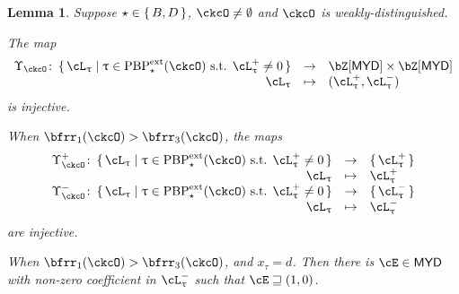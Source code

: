 \documentclass[12pt,a4paper]{amsart}
\newcommand{\pr}{\mathrm{pr}}
\def\MYD{{\mathsf{MYD}}}
\def\pac#1{\ac_{#1}^+}
\def\nac#1{\ac_{#1}^-}
\def\ac{\cL}
\numberwithin{equation}{section}
\newtheorem{lem}[thm]{Lemma}
\theoremstyle{remark}
\def\lsign{{}^l\mathrm{Sign}}
\def\PBPes{\mathrm{PBP}^{\mathrm{ext}}_{\star}}
\def\pUpsilon{\Upsilon^+}
\def\nUpsilon{\Upsilon^-}
\begin{document}
\begin{lem}\label{lem:BD3}
Suppose $\star \in \set{B,D}$, $\ckcO \neq \emptyset$ and $\ckcO$ is weakly-distinguished.
\begin{enuma}
    \item The map
    \begin{equation}\label{eq:up}
      \begin{array}{rcl}
        \Upsilon_{\ckcO} \colon \set{\ac_{\uptau}|\uptau\in \PBPes(\ckcO)
        \text{ s.t. } \pac{\uptau}\neq 0 }
        & \rightarrow &  \bZ[\MYD]\times \bZ[\MYD] \\ %
        \ac_{\uptau} &\mapsto & (\pac{\uptau},\nac{\uptau})
      \end{array}
    \end{equation}
    is injective.
  \item When $\bfrr_{1}(\ckcO)> \bfrr_{3}(\ckcO)$, the maps
    \[
      \begin{array}{rcl}
        \pUpsilon_{\ckcO} \colon \set{\ac_{\uptau}|\uptau\in \PBPes(\ckcO)
        \text{ s.t. } \pac{\uptau}\neq 0 } &\rightarrow  & \set{\pac{\uptau}}\\
       \ac_{\uptau} & \mapsto & \pac{\uptau}\\
        \nUpsilon_{\ckcO} \colon \set{\ac_{\uptau}|\uptau\in \PBPes(\ckcO)
        \text{ s.t. } \pac{\uptau}\neq 0} &\rightarrow & \set{\nac{\uptau}}\\
       \ac_{\uptau} &\mapsto & \nac{\uptau}
     \end{array}
   \]
    are injective.
    \item When $\bfrr_{1}(\ckcO)> \bfrr_{3}(\ckcO)$, and $x_{\tau}=d$.
    Then there is $\cE\in \MYD$ with non-zero coefficient in $\nac{\uptau}$ such that $\cE\sqsupseteq (1,0)$.
  \end{enuma}
\end{lem}


\end{document}
